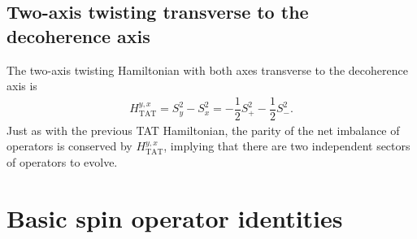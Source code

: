 \documentclass[aps,notitlepage,nofootinbib,11pt]{revtex4-1}
\renewcommand{\t}{\text} %
\newcommand{\f}[2]{\dfrac{#1}{#2}} %
\newcommand{\1}{\mathds{1}}
\begin{document}
\subsection{Two-axis twisting transverse to the decoherence axis}


The two-axis twisting Hamiltonian with both axes transverse to the
decoherence axis is
\begin{align}
  H_{\t{TAT}}^{y,x}
  = S_y^2 - S_x^2
  = - \f12 S_+^2 - \f12 S_-^2.
\end{align}
Just as with the previous TAT Hamiltonian, the parity of the net
imbalance of operators is conserved by $H_{\t{TAT}}^{y,x}$, implying
that there are two independent sectors of operators to evolve.




\newpage
\appendix

\section{Basic spin operator identities}
\label{sec:identities}
\end{document}
